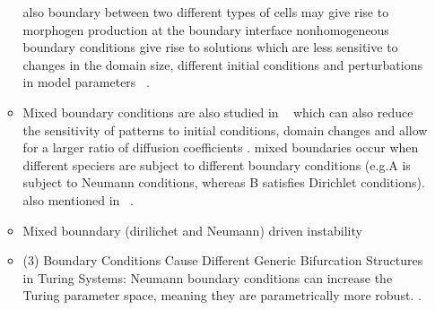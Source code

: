 \begin{itemize}
\begin{itemize}
    also boundary between two different types of cells may give rise to morphogen production at the boundary interface %
    nonhomogeneous boundary conditions give rise to solutions which are less sensitive to changes in the domain size, different initial conditions and perturbations in model parameters ~\parencite{Arcuri1986}.
        \item Mixed boundary conditions are also studied in ~\parencite{Dillon1994} which can also reduce the sensitivity of patterns to initial conditions, domain changes and allow for a larger ratio of diffusion coefficients . mixed boundaries occur when different speciers are subject to different boundary conditions (e.g.A is subject to Neumann conditions, whereas B satisfies Dirichlet conditions). also mentioned in ~\parencite{Krause2021}.
        \item Mixed bounndary (dirilichet and Neumann) driven instability %

        \item (3) Boundary Conditions Cause Different Generic Bifurcation Structures in Turing Systems: Neumann boundary conditions can increase the Turing parameter space, meaning they are parametrically more robust. \parencite{Woolley2022}. %


\end{itemize}
\end{itemize}
